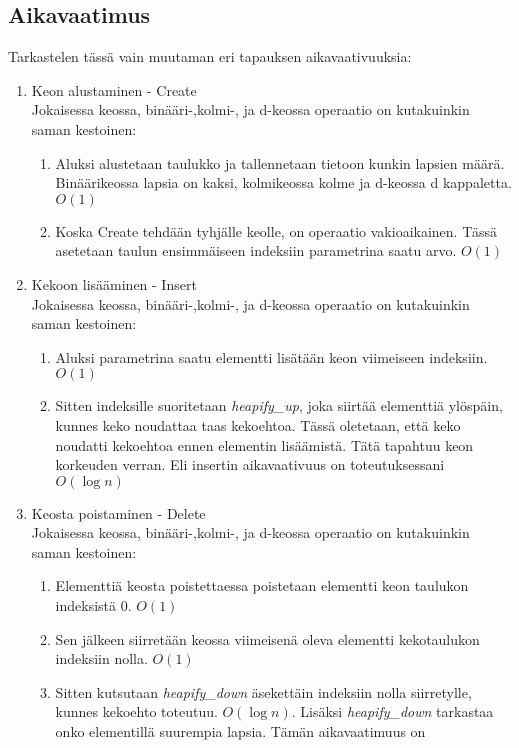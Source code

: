 \documentclass[a4paper,12pt]{article}
\begin{document}
\subsection{Aikavaatimus}
Tarkastelen tässä vain muutaman eri tapauksen aikavaativuuksia:
\begin{enumerate}
\item Keon alustaminen - Create\\
Jokaisessa keossa, binääri-,kolmi-, ja d-keossa operaatio on kutakuinkin saman kestoinen:
\begin{enumerate}
\item Aluksi alustetaan taulukko ja tallennetaan tietoon kunkin lapsien määrä.
Binäärikeossa lapsia on kaksi, kolmikeossa kolme ja d-keossa d kappaletta. $O(1)$
\item Koska Create tehdään tyhjälle keolle, on operaatio vakioaikainen. Tässä asetetaan taulun ensimmäiseen indeksiin parametrina saatu arvo. $O(1)$
\end{enumerate}
\item Kekoon lisääminen - Insert\\
Jokaisessa keossa, binääri-,kolmi-, ja d-keossa operaatio on kutakuinkin saman kestoinen:
\begin{enumerate}
\item Aluksi parametrina saatu elementti lisätään keon viimeiseen indeksiin.$O(1)$
\item Sitten indeksille suoritetaan \emph{heapify\_up}, joka siirtää elementtiä ylöspäin, kunnes keko noudattaa taas kekoehtoa. Tässä oletetaan, että keko noudatti kekoehtoa ennen elementin lisäämistä.
Tätä tapahtuu keon korkeuden verran. Eli insertin aikavaativuus on toteutuksessani $O(\log n)$
\end{enumerate}
\item Keosta poistaminen - Delete\\
Jokaisessa keossa, binääri-,kolmi-, ja d-keossa operaatio on kutakuinkin saman kestoinen:
\begin{enumerate}
\item Elementtiä keosta poistettaessa poistetaan elementti keon taulukon indeksistä 0. $O(1)$
\item Sen jälkeen siirretään keossa viimeisenä oleva elementti kekotaulukon indeksiin nolla. $O(1)$
\item Sitten kutsutaan \emph{heapify\_down} äsekettäin indeksiin nolla siirretylle, kunnes kekoehto toteutuu. $O(\log n)$. Lisäksi \emph{heapify\_down} tarkastaa onko elementillä suurempia lapsia. Tämän aikavaatimuus on 
\end{enumerate}
\end{enumerate}
\end{document}
